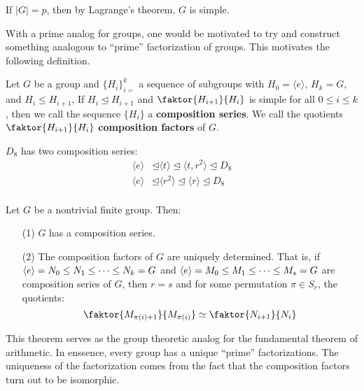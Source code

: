 \begin{example}\label{example_3.8}
  If $|G|=p$, then by Lagrange's theorem, $G$ is simple.
\end{example}

With a prime analog for groups, one would be motivated to try and construct
something analogous to ``prime'' factorization of groups. This motivates the
following definition.

\begin{definition}
  Let $G$ be a group and $\{H_i\}_{i=}^k$ a sequence of subgroups with
  $H_0=\langle e \rangle$, $H_k=G$, and  $H_i \leq H_{i+1}$, If $H_i \unlhd H_{i+1}$
  and $\faktor{H_{i+1}}{H_i}$ is simple for all $0 \leq i \leq k$, then we
  call the sequence  $\{H_i\}$ a \textbf{composition series}. We call the
  quotients $\faktor{H_{i+1}}{H_i}$ \textbf{composition factors} of $G$.
\end{definition}

\begin{example}\label{example_3.9}
  $D_8$ has two composition series:
  \begin{align*}
    \langle e \rangle & \unlhd \langle t \rangle \unlhd \langle t, r^2
    \rangle \unlhd D_8  \\
    \langle e \rangle & \unlhd \langle r^2 \rangle \unlhd \langle r
    \rangle \unlhd D_8  \\
  \end{align*}
\end{example}

\begin{theorem}\label{theorem_3.5.2}
  Let $G$ be a nontrivial finite group. Then:
  \begin{enumerate}
    \item[(1)] $G$ has a composition series.

    \item[(2)] The composition factors of  $G$ are uniquely determined. That
      is, if $\langle e\rangle=N_0 \leq N_1 \leq \dots \leq N_k=G$ and
      $\langle e\rangle=M_0 \leq M_1 \leq \dots \leq M_s=G$ are composition
      series of $G$, then  $r=s$ and for some permutation  $\pi \in S_r$,
      the quotients:
      \begin{equation*}
        \faktor{M_{\pi(i)+1}}{M_{\pi(i)}} \simeq \faktor{N_{i+1}}{N_i}
      \end{equation*}
  \end{enumerate}
\end{theorem}
\begin{remark}
  This theorem serves as the group theoretic analog for the fundamental theorem of
  arithmetic. In enssence, every group has a unique ``prime'' factorizations.
  The uniqueness of the factorization comes from the fact that the composition
  factors turn out to be isomorphic.
\end{remark}

